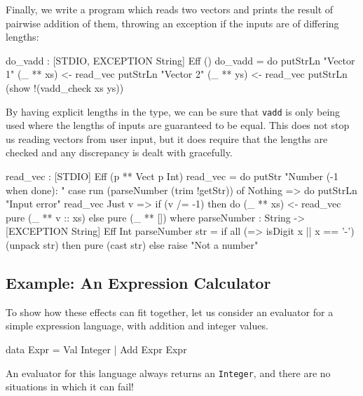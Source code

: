 Finally, we write a program which reads two vectors and prints the result
of pairwise addition of them, throwing an exception if the inputs are of
differing lengths:

\begin{code}
do_vadd : { [STDIO, EXCEPTION String] } Eff ()
do_vadd = do putStrLn "Vector 1"
             (_ ** xs) <- read_vec
             putStrLn "Vector 2"
             (_ ** ys) <- read_vec
             putStrLn (show !(vadd_check xs ys))
\end{code}

\noindent
By having explicit lengths in the type, we can be sure that \texttt{vadd} is
only being used where the lengths of inputs are guaranteed to be equal. This
does not stop us reading vectors from user input, but it does require that
the lengths are checked and any discrepancy is dealt with gracefully.

\begin{code}[float=h,frame=single,caption={Reading a vector from the console},label=readvec]
read_vec : { [STDIO] } Eff (p ** Vect p Int)
read_vec = do putStr "Number (-1 when done): "
              case run (parseNumber (trim !getStr)) of
                   Nothing => do putStrLn "Input error"
                                 read_vec
                   Just v => if (v /= -1)
                                then do (_ ** xs) <- read_vec
                                        pure (_ ** v :: xs)
                                else pure (_ ** [])
  where
    parseNumber : String -> { [EXCEPTION String] } Eff Int
    parseNumber str
      = if all (\x => isDigit x || x == '-') (unpack str)
           then pure (cast str)
           else raise "Not a number"
\end{code}

\subsection{Example: An Expression Calculator}

To show how these effects can fit together, let us consider an evaluator for
a simple expression language, with addition and integer values.

\begin{code}
data Expr = Val Integer
          | Add Expr Expr
\end{code}

\noindent
An evaluator for this language always returns an \texttt{Integer}, and there
are no situations in which it can fail!

